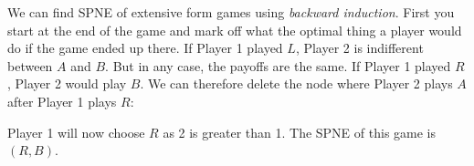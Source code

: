 \documentclass{article}
\begin{document}
    We can find SPNE of extensive form games using \emph{backward induction}. First you start at the end of the game and mark off what the optimal thing a player would do if the game ended up there. If Player 1 played $L$, Player 2 is indifferent between $A$ and $B$. But in any case, the payoffs are the same. If Player 1 played $R$, Player 2 would play $B$. We can therefore delete the node where Player 2 plays $A$ after Player 1 plays $R$:
\begin{center}
\end{center}
Player 1 will now choose $R$ as 2 is greater than 1. The SPNE of this game is $\left( R,B \right)$.
\end{document}
